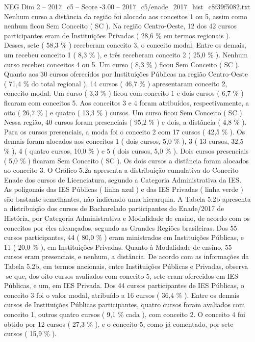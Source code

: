 \begin{textsample}{NEG Dim 2 – 2017\_c5 – Score -3.00 – 2017\_c5/enade\_2017\_hist\_c8f39f5082.txt}
Nenhum curso a distância da região foi alocado aos conceitos 1 ou 5, assim como nenhum ficou Sem Conceito ( SC ).
Na região Centro-Oeste, 12 dos 42 cursos participantes eram de Instituições Privadas ( 28,6 \% em termos regionais ).
Desses, sete ( 58,3 \% ) receberam conceito 3, o conceito modal.
Entre os demais, um recebeu conceito 1 ( 8,3 \% ), e três receberam conceito 2 ( 25,0 \% ).
Nenhum curso recebeu conceitos 4 ou 5.
Um curso ( 8,3 \% ) ficou Sem Conceito ( SC ).
Quanto aos 30 cursos oferecidos por Instituições Públicas na região Centro-Oeste ( 71,4 \% do total regional ), 14 cursos ( 46,7 \% ) apresentaram conceito 2, conceito modal.
Um curso ( 3,3 \% ) ficou com conceito 1 e dois cursos ( 6,7 \% ) ficaram com conceitos 5.
Aos conceitos 3 e 4 foram atribuídos, respectivamente, a oito ( 26,7 \% ) e quatro ( 13,3 \% ) cursos.
Um curso ficou Sem Conceito ( SC ).
Nessa região, 40 cursos foram presenciais ( 95,2 \% ) e dois, a distância ( 4,8 \% ).
Para os cursos presenciais, a moda foi o conceito 2 com 17 cursos ( 42,5 \% ).
Os demais foram alocados aos conceitos 1 ( dois cursos, 5,0 \% ), 3 ( 13 cursos, 32,5 \% ), 4 ( quatro cursos, 10,0 \% ) e 5 ( dois cursos, 5,0 \% ).
Dois cursos presenciais ( 5,0 \% ) ficaram Sem Conceito ( SC ).
Os dois cursos a distância foram alocados ao conceito 3.
O Gráfico 5.2a apresenta a distribuição cumulativa do Conceito Enade dos cursos de Licenciatura, segundo a Categoria Administrativa da IES.
As poligonais das IES Públicas ( linha azul ) e das IES Privadas ( linha verde ) são bastante semelhantes, não indicando uma hierarquia.
A Tabela 5.2b apresenta a distribuição dos cursos de Bacharelado participantes do Enade/2017 de História, por Categoria Administrativa e Modalidade de ensino, de acordo com os conceitos por eles alcançados, segundo as Grandes Regiões brasileiras.
Dos 55 cursos participantes, 44 ( 80,0 \% ) eram ministrados em Instituições Públicas, e 11 ( 20,0 \% ), em Instituições Privadas.
Quanto à Modalidade de ensino, 55 cursos eram presenciais, e nenhum, a distância.
De acordo com as informações da Tabela 5.2b, em termos nacionais, entre Instituições Públicas e Privadas, observa -se que, dos oito cursos avaliados com conceito 5, sete eram oferecidos em IES Públicas, e um, em IES Privada.
Dos 44 cursos participantes de IES Públicas, o conceito 3 foi o valor modal, atribuído a 16 cursos ( 36,4 \% ).
Entre os demais cursos de Instituições Públicas participantes, quatro cursos foram avaliados com conceito 1, outros quatro cursos ( 9,1 \% cada ), com conceito 2.
O conceito 4 foi obtido por 12 cursos ( 27,3 \% ), e o conceito 5, como já comentado, por sete cursos ( 15,9 \% ).

\end{textsample}
